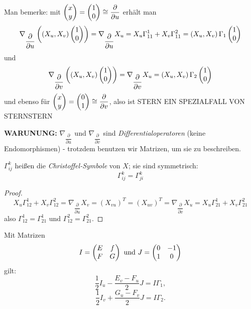 	Man bemerke: mit $ \begin{pmatrix} x \\ y \end{pmatrix} = \begin{pmatrix} 1 \\ 0 \end{pmatrix} \cong \dfrac{\partial}{\partial u} $ erhält man
		\[ \nabla_{\dfrac{\partial}{\partial u}}\left( \left( X_u,X_v \right) \begin{pmatrix} 1 \\ 0 \end{pmatrix} \right) = \nabla_{\dfrac{\partial}{\partial u}}X_u = X_u \Gamma_{11}^1 + X_v\Gamma_{11}^2 = \left( X_u,X_v \right) \Gamma_1\begin{pmatrix} 1 \\ 0 \end{pmatrix}   \] 
	und
		\[ \nabla_{\dfrac{\partial}{\partial v}} \left( \left( X_u,X_v \right) \begin{pmatrix} 1 \\ 0 \end{pmatrix} \right) = \nabla_{\dfrac{\partial}{\partial v}}X_u = \left( X_u,X_v \right) \Gamma_2\begin{pmatrix} 1 \\ 0 \end{pmatrix} \]
	und ebenso für  $ \begin{pmatrix} x \\ y \end{pmatrix} = \begin{pmatrix} 0 \\ 1 \end{pmatrix} \cong \dfrac{\partial}{\partial v} $, also ist {\color{Cyan} STERN EIN SPEZIALFALL VON STERNSTERN}
	
	\begin{remark}
		\textbf{WARUNUNG:} $ \nabla_{\dfrac{\partial}{\partial u}} $ und $ \nabla_{\dfrac{\partial}{\partial v}} $ sind \emph{Differentialoperatoren} (keine Endomorphismen) - trotzdem benutzen wir Matrizen, um sie zu beschreiben.
	\end{remark}

\begin{lemma, definition}
	
	$\Gamma_{ij}^k$ heißen die \emph{Christoffel-Symbole} von $ X $; sie sind symmetrisch: 
		\[ \Gamma_{ij}^k = \Gamma_{ji}^k \]
	
\end{lemma, definition}

\begin{proof}
	
		\[ X_u\Gamma_{12}^1 + X_v \Gamma_{12}^2 = \nabla_{\dfrac{\partial}{\partial u}}X_v = \left( X_{vu} \right)^T = \left( X_{uv} \right)^T = \nabla_{\dfrac{\partial}{\partial v}}X_u = X_u\Gamma_{21}^1 + X_v\Gamma_{21}^2   \]
	also $ \Gamma_{12}^1 = \Gamma_{21}^1 $ und $ \Gamma_{12}^2 = \Gamma_{21}^2 $.
\end{proof}

\begin{theorem}
	
	Mit Matrizen 
		\[ I = \begin{pmatrix} E &f \\ F &G \end{pmatrix} \text{ und } J = \begin{pmatrix} 0 &-1 \\ 1 & 0  \end{pmatrix} \]
	gilt: 
		\[ \frac12 I_u - \frac{E_v - F_u}{2}J = I\Gamma_1, \]
		\[ \frac12 I_v + \frac{G_u - F_v}{2}J = I\Gamma_2. \]
		
\end{theorem}

